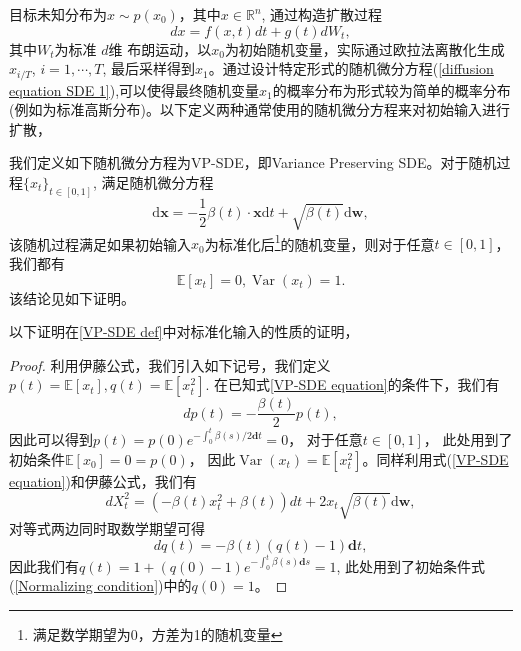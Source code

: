 目标未知分布为$x\sim p(x_0)$，其中$x\in \mathbb{R}^n$, 通过构造扩散过程
\begin{equation}
    dx = f(x,t)dt + g(t)dW_t,
    \label{diffusion equation SDE 1}
\end{equation}
其中$W_t$为标准 $d$维 布朗运动，以$x_0$为初始随机变量，实际通过欧拉法离散化生成$x_{i/T}$, $i=1,\cdots, T$, 最后采样得到$x_1$。通过设计特定形式的随机微分方程(\ref{diffusion equation SDE 1}),可以使得最终随机变量$x_1$的概率分布为形式较为简单的概率分布 (例如为标准高斯分布)。以下定义两种通常使用的随机微分方程来对初始输入进行扩散， 
\begin{definition}
\label{VP-SDE def}
    我们定义如下随机微分方程为VP-SDE，即Variance Preserving SDE。对于随机过程$\{x_t\}_{t\in [0,1]}$, 满足随机微分方程
    \begin{equation}
   \mathrm{d} \mathbf{x}=-\frac{1}{2} \beta(t) \cdot \mathbf{x} \mathrm{d} t+\sqrt{\beta(t)} \mathrm{d} \mathbf{w}, \label{VP-SDE equation} 
    \end{equation}
    该随机过程满足如果初始输入$x_0$为标准化后\footnote{满足数学期望为0，方差为1的随机变量}的随机变量，则对于任意$t\in [0,1]$，我们都有
    \begin{equation}
        \mathbb{E}\left[x_t\right]=0, \operatorname{Var}\left(x_t\right)=1 .
        \label{Normalizing condition}
    \end{equation}
    该结论见如下证明。
\end{definition}
以下证明在\ref{VP-SDE def}中对标准化输入的性质的证明，
\begin{proof}
    利用伊藤公式，我们引入如下记号，我们定义$p(t) = \mathbb{E}\left[x_t\right],q(t) = \mathbb{E}\left[x_t^2\right]$. 在已知式\ref{VP-SDE equation}的条件下，我们有
    \begin{equation}
        dp(t) = -\frac{\beta(t)}{2}p(t),
    \end{equation}
    因此可以得到$p(t) = p(0)e^{-\int_{0}^t \beta(s)/2\mathbf{d}t} = 0 $， 对于任意$t\in [0,1]$， 此处用到了初始条件$\mathbb{E}\left[x_0\right]=0=p(0)$， 因此$\operatorname{Var}\left(x_t\right)=\mathbb{E}\left[x_t^2\right]$。同样利用式(\ref{VP-SDE equation})和伊藤公式，我们有
    \begin{equation}
        dX_t^2 = \left(-\beta(t)x_t^2 + \beta(t)\right)dt + 2x_t \sqrt{\beta(t)} \mathrm{d} \mathbf{w},
    \end{equation}
    对等式两边同时取数学期望可得
    \begin{equation}
        dq(t) = -\beta(t) \left(q(t)-1\right)\mathbf{d}t,
    \end{equation}
    因此我们有$q(t) = 1 + \left(q(0)-1\right)e^{-\int_{0}^t \beta(s)\mathbf{d}s}= 1$, 此处用到了初始条件式(\ref{Normalizing condition})中的$q(0)=1$。
\end{proof}

